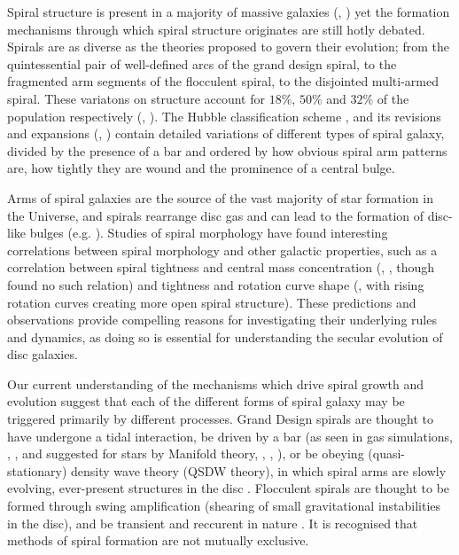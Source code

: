 
Spiral structure is present in a majority of massive galaxies (\citealt{1989gadv.book..151B}, \citealt{2008MNRAS.389.1179L}) yet the formation mechanisms through which spiral structure originates are still hotly debated. Spirals are as diverse as the theories proposed to govern their evolution; from the quintessential pair of well-defined arcs of the grand design spiral, to the fragmented arm segments of the flocculent spiral, to the disjointed multi-armed spiral. These variatons on structure account for $18\%$, $50\%$ and $32\%$ of the population respectively (\citealt{2011ApJ...737...32E}, \citealt{2015yCat..22170032B}). The Hubble classification scheme \citep{1926ApJ....64..321H}, and its revisions and expansions (\citealt{1961hag..book.....S}, \citealt{1991rc3..book.....D}) contain detailed variations of different types of spiral galaxy, divided by the presence of a bar and ordered by how obvious spiral arm patterns are, how tightly they are wound and the prominence of a central bulge.

Arms of spiral galaxies are the source of the vast majority of star formation in the Universe, and spirals rearrange disc gas and can lead to the formation of disc-like bulges (e.g. \citealt{2004ARA&A..42..603K}). Studies of spiral morphology have found interesting correlations between spiral morphology and other galactic properties, such as a correlation between spiral tightness and central mass concentration (\citealt{2019ApJ...871..194Y}, \citealt{2015PhDT........14D}, though \citealt{2017MNRAS.472.2263H} found no such relation) and tightness and rotation curve shape (\citealt{2005MNRAS.359.1065S}, with rising rotation curves creating more open spiral structure). These predictions and observations provide compelling reasons for investigating their underlying rules and dynamics, as doing so is essential for understanding the secular evolution of disc galaxies.

Our current understanding of the mechanisms which drive spiral growth and evolution suggest that each of the different forms of spiral galaxy may be triggered primarily by different processes. Grand Design spirals are thought to have undergone a tidal interaction, be driven by a bar (as seen in gas simulations, \citealt{1976ApJ...209...53S}, \citealt{2008A&A...489..115R}, and suggested for stars by Manifold theory, \citealt{2006A&A...453...39R}, \citealt{2009MNRAS.394...67A}, \citealt{2009MNRAS.400.1706A}), or be obeying (quasi-stationary) density wave theory (QSDW theory), in which spiral arms are slowly evolving, ever-present structures in the disc \citep{1964ApJ...140..646L}. Flocculent spirals are thought to be formed through swing amplification (shearing of small gravitational instabilities in the disc), and be transient and reccurent in nature \citep{1966ApJ...146..810J}. It is recognised that methods of spiral formation are not mutually exclusive.

